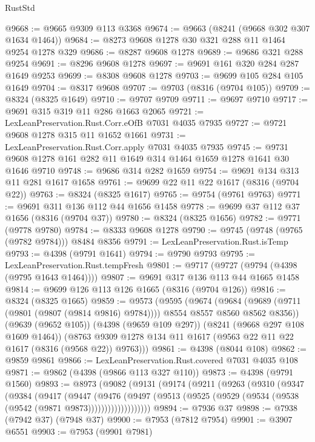 \begin{lexlean}{RustStd}
\begin{coremodule}
@9668 := @9665 @9309 @113 @3368
@9674 := @9663 (@8241 (@9668 @302 @307 @1634 @1464))
@9684 := @8273 @9608 @1278 @30 @321 @288 @11 @1464 @9254 @1278 @329
@9686 := @8287 @9608 @1278
@9689 := @9686 @321 @288 @9254
@9691 := @8296 @9608 @1278
@9697 := @9691 @161 @320 @284 @287 @1649 @9253
@9699 := @8308 @9608 @1278
@9703 := @9699 @105 @284 @105 @1649
@9704 := @8317 @9608
@9707 := @9703 (@8316 (@9704 @105))
@9709 := @8324 (@8325 @1649)
@9710 := @9707 @9709
@9711 := @9697 @9710
@9717 := @9691 @315 @319 @11 @286 @1663 @2065
@9721 := LexLeanPreservation.Rust.Corr.eOfB @7031 @4035 @7935
@9727 := @9721 @9608 @1278 @315 @11 @1652 @1661
@9731 := LexLeanPreservation.Rust.Corr.apply @7031 @4035 @7935
@9745 := @9731 @9608 @1278 @161 @282 @11 @1649 @314 @1464 @1659 @1278 @1641 @30 @1646 @9710
@9748 := @9686 @314 @282 @1659
@9754 := @9691 @134 @313 @11 @281 @1617 @1658
@9761 := @9699 @22 @11 @22 @1617 (@8316 (@9704 @22))
@9763 := @8324 (@8325 @1617)
@9765 := @9754 (@9761 @9763)
@9771 := @9691 @311 @136 @112 @44 @1656 @1458
@9778 := @9699 @37 @112 @37 @1656 (@8316 (@9704 @37))
@9780 := @8324 (@8325 @1656)
@9782 := @9771 (@9778 @9780)
@9784 := @8333 @9608 @1278
@9790 := @9745 (@9748 (@9765 (@9782 @9784))) @8484 @8356
@9791 := LexLeanPreservation.Rust.isTemp
@9793 := @4398 (@9791 @1641)
@9794 := @9790 @9793
@9795 := LexLeanPreservation.Rust.tempFresh
@9801 := @9717 (@9727 (@9794 (@4398 (@9795 @1643 @1464))))
@9807 := @9691 @317 @136 @113 @44 @1665 @1458
@9814 := @9699 @126 @113 @126 @1665 (@8316 (@9704 @126))
@9816 := @8324 (@8325 @1665)
@9859 := @9573
    (@9595
      (@9674
        (@9684 (@9689 (@9711 (@9801 (@9807 (@9814 @9816) @9784)))) @8554 @8557 @8560 @8562 @8356))
      (@9639 (@9652 @105))
      (@4398 (@9659 @109 @297))
      (@8241 (@9668 @297 @108 @1609 @1464))
      (@8763 @9309 @1278 @134 @11 @1617 (@9563 @22 @11 @22 @1617 (@8316 (@9568 @22)) @9763)))
@9861 := @4398 (@8044 @108)
@9862 := @9859 @9861
@9866 := LexLeanPreservation.Rust.covered @7031 @4035 @108
@9871 := @9862 (@4398 (@9866 @113 @327 @110))
@9873 := @4398 (@9791 @1560)
@9893 := @8973
    (@9082
      (@9131
        (@9174
          (@9211
            (@9263
              (@9310
                (@9347
                  (@9384
                    (@9417
                      (@9447
                        (@9476
                          (@9497
                            (@9513
                              (@9525 (@9529 (@9534 (@9538 (@9542 (@9871 @9873)))))))))))))))))))
@9894 := @7936 @37
@9898 := @7938 (@7942 @37) (@7948 @37)
@9900 := @7953 (@7812 @7954)
@9901 := @3907 @6551
@9903 := @7953 (@9901 @7981)

\end{coremodule}
\end{lexlean}
